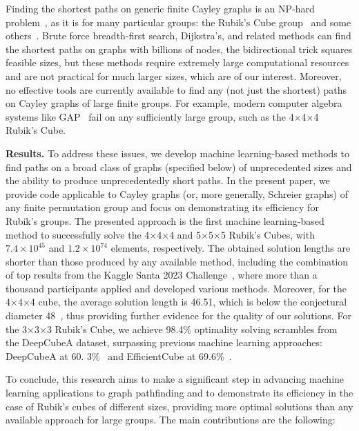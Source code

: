Finding the shortest paths on generic finite Cayley graphs is an NP-hard problem~\cite{even1981minimum}, as it is for many particular groups: the Rubik's Cube group~\cite{demaine2017solving} and some others~\cite{bulteau2015pancake, wilson2024cayley}.
Brute force breadth-first search, Dijkstra's, and related methods can find the shortest paths on graphs with billions of nodes, the bidirectional trick squares feasible sizes, but these methods require extremely large computational resources and are not practical for much larger sizes, which are of our interest.
Moreover, no effective tools are currently available to find any (not just the shortest) paths on Cayley graphs of large finite groups. For example, modern computer algebra systems like GAP~\cite{linton2007gap} fail on any sufficiently large group, such as the 4$\times$4$\times$4 Rubik's Cube.

{\bf Results.} To address these issues, we develop machine learning-based methods to find paths on a broad class of graphs (specified below) of unprecedented sizes and the ability to produce unprecedentedly short paths. In the present paper, we provide code applicable to Cayley graphs (or, more generally, Schreier graphs) of any finite permutation group and focus on demonstrating its efficiency for Rubik's groups.
The presented approach is the first machine learning-based method to successfully solve the 4$\times$4$\times$4 and 5$\times$5$\times$5 Rubik's Cubes, with  $7.4\times{10}^{45}$ and $ 1.2\times{10}^{74}$ elements, respectively. The obtained solution lengths are shorter than those produced by any available method, including the combination of top results from the Kaggle Santa 2023 Challenge~\cite{santa-2023}, where more than a thousand participants applied and developed various methods.
Moreover, for the 4$\times$4$\times$4 cube, the average solution length is 46.51, which is below the conjectural diameter 48~\cite{hirata2024graph}, thus providing further evidence for the quality of our solutions.
For the 3$\times$3$\times$3 Rubik's Cube, we achieve 98.4\% optimality solving scrambles from the DeepCubeA dataset, surpassing previous machine learning approaches: DeepCubeA at 60. 3\%~\cite{agostinelli2019solving} and EfficientCube at 69.6\%~\cite{takano2023selfsupervision}. 

To conclude, this research aims to make a significant step in advancing machine learning applications to graph pathfinding and to demonstrate its efficiency in the case of Rubik's cubes of different sizes, providing more optimal solutions than any available approach for large groups.
The main contributions are the following:

